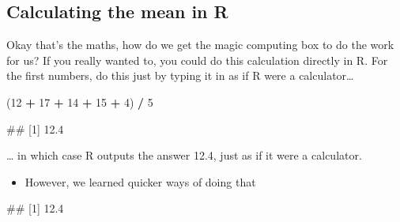 \documentclass[
]{book}
\newenvironment{Shaded}{\begin{snugshade}}{\end{snugshade}}
\newcommand{\CommentTok}[1]{\textcolor[rgb]{0.56,0.35,0.01}{\textit{#1}}}
\newcommand{\DecValTok}[1]{\textcolor[rgb]{0.00,0.00,0.81}{#1}}
\newcommand{\FunctionTok}[1]{\textcolor[rgb]{0.13,0.29,0.53}{\textbf{#1}}}
\newcommand{\NormalTok}[1]{#1}
\newcommand{\SpecialCharTok}[1]{\textcolor[rgb]{0.81,0.36,0.00}{\textbf{#1}}}
\providecommand{\tightlist}{%
  \setlength{\itemsep}{0pt}\setlength{\parskip}{0pt}}
\begin{document}
\hypertarget{calculating-the-mean-in-r}{%
\subsection{Calculating the mean in R}\label{calculating-the-mean-in-r}}

Okay that's the maths, how do we get the magic computing box to do the work for us? If you really wanted to, you could do this calculation directly in R. For the first numbers, do this just by typing it in as if R were a calculator\ldots{}

\begin{Shaded}
\begin{Highlighting}[]
\NormalTok{(}\DecValTok{12} \SpecialCharTok{+} \DecValTok{17} \SpecialCharTok{+} \DecValTok{14} \SpecialCharTok{+} \DecValTok{15} \SpecialCharTok{+} \DecValTok{4}\NormalTok{) }\SpecialCharTok{/} \DecValTok{5}
\end{Highlighting}
\end{Shaded}

\begin{Shaded}
\begin{Highlighting}[]
\NormalTok{\#\# [1] 12.4}
\end{Highlighting}
\end{Shaded}

\ldots{} in which case R outputs the answer 12.4, just as if it were a calculator.

\begin{itemize}
\tightlist
\item
  However, we learned quicker ways of doing that
\end{itemize}

\begin{Shaded}
\end{Shaded}

\begin{Shaded}
\begin{Highlighting}[]
\NormalTok{\#\# [1] 12.4}
\end{Highlighting}
\end{Shaded}

\begin{Shaded}
\end{Shaded}
\end{document}
